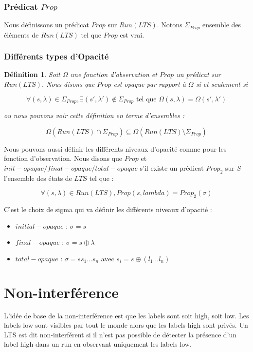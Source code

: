 \documentclass[10pt,a4paper]{article}
\newtheorem {mydef} {D\'efinition}
\begin{document}
\subsubsection{Pr\'edicat $Prop$}	
	Nous d\'efinissons un pr\'edicat $Prop$ sur $Run(LTS)$. Notons $\Sigma_{Prop}$ ensemble des \'el\'ements de $Run(LTS)$ tel que $Prop$ est vrai.
	
\subsubsection{Diff\'erents types d'Opacit\'e}

\begin{mydef}
	Soit $\Omega$ une fonction d'observation et $Prop$ un pr\'edicat sur $Run(LTS)$. Nous disons que $Prop$ est opaque par rapport \`a $\Omega$ si et seulement si
	
	$$\forall (s,\lambda) \in \Sigma_{Prop}, \exists (s',\lambda')\not\in \Sigma_{Prop} \mbox{ tel que } \Omega(s,\lambda) = \Omega (s',\lambda')$$
	
	ou nous pouvons voir cette d\'efinition en terme d'ensembles :
	
	$$\Omega(Run(LTS)\cap \Sigma_{Prop})\subseteq \Omega(Run(LTS)\setminus\Sigma_{Prop})$$
\end{mydef}

Nous pouvons aussi d\'efinir les diff\'erents niveaux d'opacit\'e comme pour les fonction d'observation. Nous disons que $Prop$ et $init-opaque/final-opaque/total-opaque$ s'il existe un pr\'edicat $Prop_2$ sur $S$ l'ensemble des \'etats de $LTS$ tel que :

$$\forall (s,\lambda) \in Run(LTS), Prop(s,lambda) = Prop_2(\sigma)$$

C'est le choix de sigma qui va d\'efinir les diff\'erents niveaux d'opacit\'e :

\begin{itemize}
	\item $initial-opaque$ : $\sigma = s$
	\item $final-opaque$ : $\sigma = s\oplus \lambda$
	\item $total-opaque$ : $\sigma = s s_1 \dots s_n \mbox{ avec } s_i = s\oplus(l_1\dots l_n)$
\end{itemize} 

\section{Non-interf\'erence}

L'id\'ee de base de la non-interf\'erence est que les labels sont soit high, soit low. Les labels low sont visibles par tout le monde alors que les labels high sont priv\'es. Un LTS est dit non-interf\'erent si il n'est pas possible de d\'etecter la pr\'esence d'un label high dans un run en observant uniquement les labels low.
\end{document}
